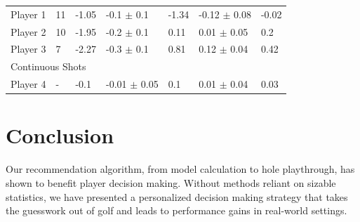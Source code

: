 \documentclass[11pt,a4paper]{article}
\begin{document}
\begin{table}[h!]
\begin{tabular}{lllllll}
Player 1                    & 11 & -1.05        & \multicolumn{1}{l|}{-0.1 $\pm$ 0.1}    & -1.34 & -0.12 $\pm$ 0.08  & -0.02 \\
Player 2                    & 10 & -1.95        & \multicolumn{1}{l|}{-0.2 $\pm$ 0.1}    & 0.11 & 0.01 $\pm$ 0.05 & 0.2\\
Player 3                    & 7 & -2.27         & \multicolumn{1}{l|}{-0.3 $\pm$ 0.1}    & 0.81 & 0.12 $\pm$ 0.04 & 0.42\\ \hline \hline
\multicolumn{5}{l}{Continuous Shots}                                                                                         \\ \hline
Player 4                    & -  & -0.1      & \multicolumn{1}{l|}{-0.01 $\pm$ 0.05}     & 0.1       & 0.01 $\pm$ 0.04 & 0.03    
\end{tabular}
\label{tab:results}
\end{table}


\section{Conclusion}
Our recommendation algorithm, from model calculation to hole playthrough, has shown to benefit player decision making. Without methods reliant on sizable statistics, we have presented a personalized decision making strategy that takes the guesswork out of golf and leads to performance gains in real-world settings.
\end{document}
